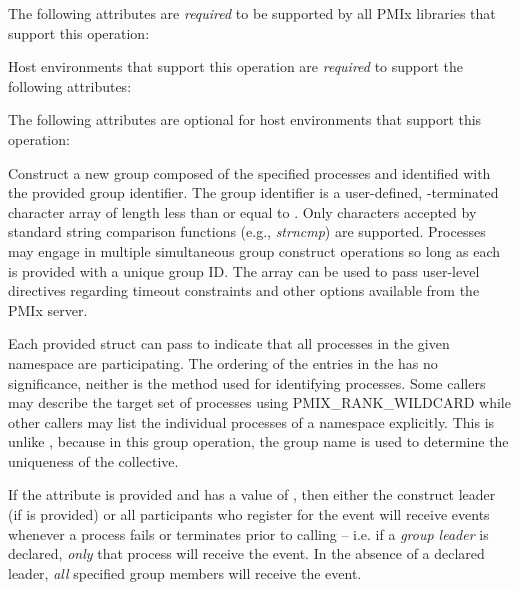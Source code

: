 \returnsimple

\reqattrstart
The following attributes are \textit{required} to be supported by all \ac{PMIx} libraries that support this operation:


Host environments that support this operation are \textit{required} to support the following attributes:


\reqattrend

\optattrstart
The following attributes are optional for host environments that support this operation:


\optattrend

\descr

Construct a new group composed of the specified processes and identified with the provided group identifier. The group identifier is a user-defined, -terminated character array of length less than or equal to . Only characters accepted by standard string comparison functions (e.g., \emph{strncmp}) are supported. Processes may engage in multiple simultaneous group construct operations so long as each is provided with a unique group ID. The  array can be used to pass user-level directives regarding timeout constraints and other options available from the \ac{PMIx} server.

Each provided  struct can pass  to indicate that all processes in the given namespace are participating.
The ordering of the entries in the  has no significance, neither is the method used for identifying processes.
Some callers may describe the target set of processes using PMIX_RANK_WILDCARD while other 
callers may list the individual processes of a namespace explicitly.
This is unlike , because in this group operation, the group name  is used to determine the uniqueness of the collective.

If the  attribute is provided and has a value of , then either the construct leader (if  is provided) or all participants who register for the  event will receive events whenever a process fails or terminates prior to calling  – i.e. if a \emph{group leader} is declared, \textit{only} that process will receive the event. In the absence of a declared leader, \textit{all} specified group members will receive the event.

